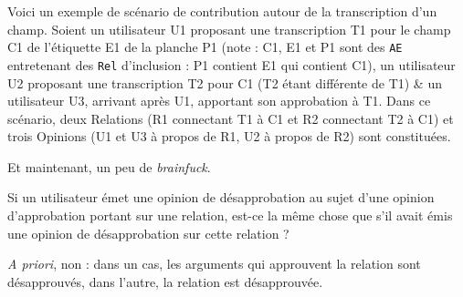 Voici un exemple de scénario de contribution autour de la transcription d'un champ.
Soient un utilisateur U1 proposant une transcription T1 pour le champ C1 de l'étiquette E1 de la planche P1 (note : C1, E1 et P1 sont des {\tt AE} entretenant des {\tt Rel} d'inclusion : P1 contient E1 qui contient C1), un utilisateur U2 proposant une transcription T2 pour C1 (T2 étant différente de T1) & un utilisateur U3, arrivant après U1, apportant son approbation à T1.
Dans ce scénario, deux Relations (R1 connectant T1 à C1 et R2 connectant T2 à C1) et trois Opinions (U1 et U3 à propos de R1, U2 à propos de R2) sont constituées.

\bigskip

Et maintenant, un peu de {\it brainfuck}.

Si un utilisateur émet une opinion de désapprobation au sujet d'une opinion d'approbation portant sur une relation, est-ce la même chose que s'il avait émis une opinion de désapprobation sur cette relation ?

{\it A priori}, non : dans un cas, les arguments qui approuvent la relation sont désapprouvés, dans l'autre, la relation est désapprouvée.